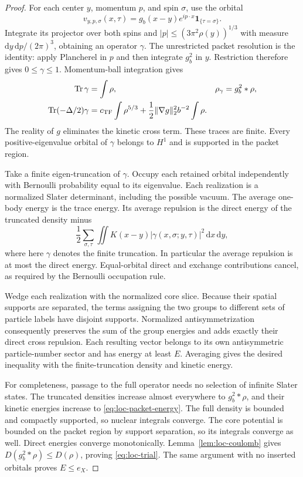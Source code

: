 \begin{proof}
For each center $y$, momentum $p$, and spin $\sigma$, use the orbital
\[
 v_{y,p,\sigma}(x,\tau)
       =g_b(x-y)e^{ip\cdot x}\mathbf1_{\{\tau=\sigma\}}.
\]
Integrate its projector over both spins and
$|p|\leq(3\pi^2\rho(y))^{1/3}$ with measure
$\mathrm dy\,\mathrm dp/(2\pi)^3$, obtaining an operator $\gamma$.
The unrestricted packet resolution is the identity: apply
Plancherel in $p$ and then integrate $g_b^2$ in $y$.  Restriction
therefore gives $0\leq\gamma\leq1$.  Momentum-ball integration gives
\begin{align}
 \operatorname{Tr}\gamma&=\int\rho,
 &\rho_\gamma&=g_b^2*\rho,\notag\\
 \operatorname{Tr}(-\Delta/2)\gamma
   &=c_{\mathrm{TF}}\int\rho^{5/3}
        +\frac12\|\nabla g\|_2^2b^{-2}\int\rho.
 \label{eq:loc-packet-energy}
\end{align}
The reality of $g$ eliminates the kinetic cross term.  These traces
are finite.  Every positive-eigenvalue orbital of $\gamma$ belongs
to $H^1$ and is supported in the packet region.

Take a finite eigen-truncation of $\gamma$.  Occupy each retained
orbital independently with Bernoulli probability equal to its
eigenvalue.  Each realization is a normalized Slater determinant,
including the possible vacuum.  The average one-body energy is the
trace energy.  Its average repulsion is the direct energy of the
truncated density minus
\[
 \frac12\sum_{\sigma,\tau}\iint
       K(x-y)|\gamma(x,\sigma;y,\tau)|^2\,\mathrm dx\,\mathrm dy,
\]
where here $\gamma$ denotes the finite truncation.  In particular
the average repulsion is at most the direct energy.  Equal-orbital
direct and exchange contributions cancel, as required by the
Bernoulli occupation rule.

Wedge each realization with the normalized core slice.  Because
their spatial supports are separated, the terms assigning the two
groups to different sets of particle labels have disjoint supports.
Normalized antisymmetrization consequently preserves the sum of the
group energies and adds exactly their direct cross repulsion.  Each
resulting vector belongs to its own antisymmetric particle-number
sector and has energy at least $E$.  Averaging gives the desired
inequality with the finite-truncation density and kinetic energy.

For completeness, passage to the full operator needs no selection
of infinite Slater states.  The truncated densities increase almost
everywhere to $g_b^2*\rho$, and their kinetic energies increase to
\eqref{eq:loc-packet-energy}.  The full density is bounded and
compactly supported, so nuclear integrals converge.  The core
potential is bounded on the packet region by support separation,
so its integrals converge as well.  Direct energies converge
monotonically.  Lemma~\ref{lem:loc-coulomb} gives
$D(g_b^2*\rho)\leq D(\rho)$, proving \eqref{eq:loc-trial}.
The same argument with no inserted orbitals proves $E\leq e_X$.
\end{proof}

